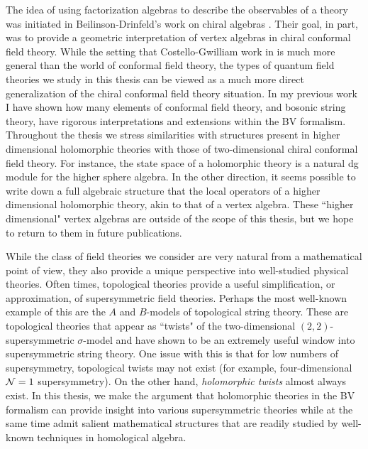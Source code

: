 The idea of using factorization algebras to describe the observables of a theory was initiated in Beilinson-Drinfeld's work on chiral algebras \cite{BD}. 
Their goal, in part, was to provide a geometric interpretation of vertex algebras in chiral conformal field theory. 
While the setting that Costello-Gwilliam work in is much more general than the world of conformal field theory, the types of quantum field theories we study in this thesis can be viewed as a much more direct generalization of the chiral conformal field theory situation. 
In my previous work \cite{BWVir, GGW, GWstring, GWsigma} I have shown how many elements of conformal field theory, and bosonic string theory, have rigorous interpretations and extensions within the BV formalism. 
Throughout the thesis we stress similarities with structures present in higher dimensional holomorphic theories with those of two-dimensional chiral conformal field theory. 
For instance, the state space of a holomorphic theory is a natural dg module for the higher sphere algebra.   
In the other direction, it seems possible to write down a full algebraic structure that the local operators of a higher dimensional holomorphic theory, akin to that of a vertex algebra. 
These ``higher dimensional" vertex algebras are outside of the scope of this thesis, but we hope to return to them in future publications. 

While the class of field theories we consider are very natural from a mathematical point of view, they also provide a unique perspective into well-studied physical theories. 
Often times, topological theories provide a useful simplification, or approximation, of supersymmetric field theories. 
Perhaps the most well-known example of this are the $A$ and $B$-models of topological string theory.
These are topological theories that appear as ``twists" of the two-dimensional $(2,2)$-supersymmetric $\sigma$-model and have shown to be an extremely useful window into supersymmetric string theory. 
One issue with this is that for low numbers of supersymmetry, topological twists may not exist (for example, four-dimensional $\mathcal N=1$ supersymmetry).
On the other hand, {\em holomorphic twists} almost always exist. 
In this thesis, we make the argument that holomorphic theories in the BV formalism can provide insight into various supersymmetric theories while at the same time admit salient mathematical structures that are readily studied by well-known techniques in homological algebra.

